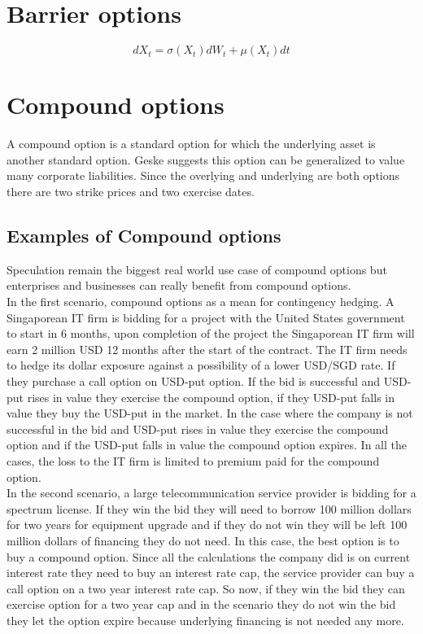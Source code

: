 \documentclass{article}
\begin{document}
\section{Barrier options
}


\[
dX_t=\sigma(X_t)dW_t + \mu(X_t) dt
\]


\section{Compound options
}
A compound option is a standard option for which the underlying asset is another standard option. Geske \cite{Geske1} suggests this option can be generalized to value many corporate liabilities.  Since the overlying and underlying are both options there are two strike prices and two exercise dates. 

\subsection{Examples of Compound options
}
Speculation remain the biggest real world use case of compound options but enterprises and businesses can really benefit from compound options.\\

In the first scenario, compound options as a mean for contingency hedging. A Singaporean IT firm is bidding for a project with the United States government to start in 6 months, upon completion of the project the Singaporean IT firm will earn 2 million USD 12 months after the start of the contract.  The IT firm needs to hedge its dollar exposure against a possibility of a lower USD/SGD rate.  If they purchase a call option on USD-put option.  If the bid is successful and USD-put rises in value they exercise the compound option, if they USD-put falls in value they buy the USD-put in the market.  In the case where the company is not successful in the bid and USD-put rises in value they exercise the compound option and if the USD-put falls in value the compound option expires.  In all the cases, the loss to the IT firm is limited to premium paid for the compound option.\\

In the second scenario, a large telecommunication service provider is bidding for a spectrum license.  If they win the bid they will need to borrow 100 million dollars for two years for equipment upgrade and if they do not win they will be left 100 million dollars of financing they do not need.  In this case, the best option is to buy a compound option.  Since all the calculations the company did is on current interest rate they need to buy an interest rate cap, the service provider can buy a call option on a two year interest rate cap.  So now, if they win the bid they can exercise option for a two year cap and in the scenario they do not win the bid they let the option expire because underlying financing is not needed any more. \\
\end{document}
